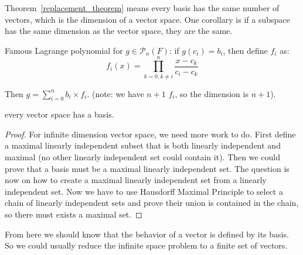 Theorem~\ref{replacement_theorem} means every basis has the same number of vectors, which is the dimension of a vector space. One corollary is if a subspace has the same dimension as the vector space, they are the same.


Famous Lagrange polynomial for $g \in \mathcal{P}_n (F)$: if $g(c_i) = b_i$, then define $f_i$ as:
\begin{equation}
    f_i(x) = \prod_{k=0,k \neq i}^{n} \frac{x - c_k}{c_i - c_k}
\end{equation}

Then $g = \sum_{i=0}^{n} b_i \times f_i $. (note: we have $n+1$ $f_i$, so the dimension is $n+1$).

\begin{theorem}
    every vector space has a basis.
\end{theorem}
\begin{proof}
    For infinite dimension vector space, we need more work to do. First define a maximal linearly independent subset that is both linearly independent and maximal (no other linearly independent set could contain it). Then we could prove that a basis must be a maximal linearly independent set. The question is now on how to create a maximal linearly independent set from a linearly independent set. Now we have to use Hausdorff Maximal Principle to select a chain of linearly independent sets and prove their union is contained in the chain, so there must exists a maximal set.
\end{proof}


From here we should know that the behavior of a vector is defined by its basis. So we could usually reduce the infinite space problem to a finite set of vectors.

















